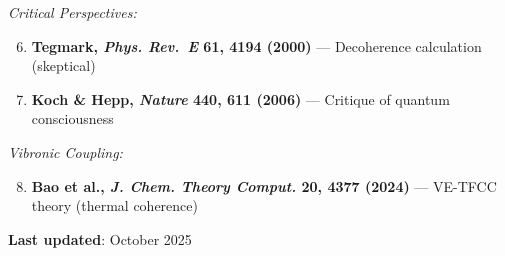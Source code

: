 \textit{Critical Perspectives:}
\begin{enumerate}
\setcounter{enumi}{5}
\item \textbf{Tegmark, \emph{Phys. Rev.~E} 61, 4194 (2000)} --- Decoherence calculation (skeptical)
\item \textbf{Koch \& Hepp, \emph{Nature} 440, 611 (2006)} --- Critique of quantum consciousness
\end{enumerate}

\textit{Vibronic Coupling:}
\begin{enumerate}
\setcounter{enumi}{7}
\item \textbf{Bao et al., \emph{J. Chem. Theory Comput.} 20, 4377 (2024)} --- VE-TFCC theory (thermal coherence)
\end{enumerate}

\textbf{Last updated}: October 2025
